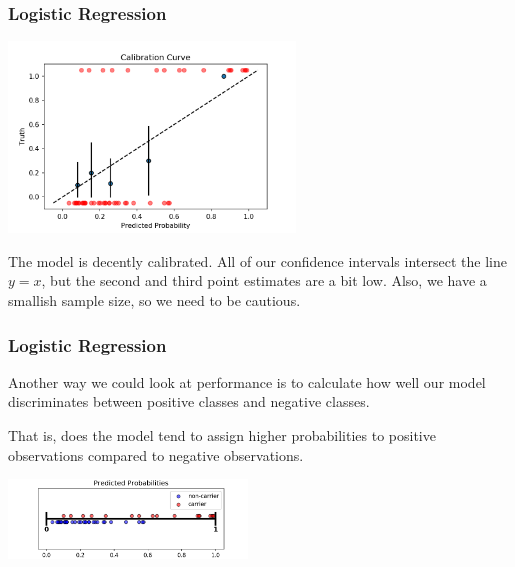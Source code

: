 \documentclass[11pt, table]{beamer}
\begin{document}
\begin{frame}
\frametitle{Logistic Regression}
\begin{center}
	\includegraphics[width=3in]{images/Dystrophy/calib_01.png}
\end{center}

The model is decently calibrated. All of our confidence intervals intersect the line $y=x$, but the second and third point estimates are a bit low. Also, we have a smallish sample size, so we need to be cautious. 
\end{frame}

\begin{frame}
\frametitle{Logistic Regression}
Another way we could look at performance is to calculate how well our model discriminates between positive classes and negative classes. 
\vspace{0.1in}

That is, does the model tend to assign higher probabilities to positive observations compared to negative observations. 
\vspace{0.1in}

\begin{center}
	\includegraphics[width = 2.5in]{images/Dystrophy/pred_proba_01.png}
\end{center}
\end{frame}
\end{document}
